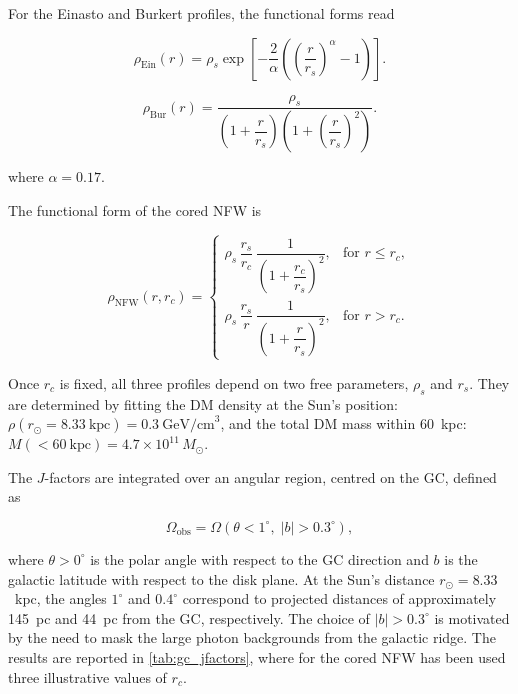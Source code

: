 For the Einasto and Burkert profiles, the functional forms read

\begin{equation}
\label{eq:rho_einasto}
\rho_{\mathrm{Ein}}(r)
=
\rho_s \exp\!\left[
-\frac{2}{\alpha}\left(\left(\frac{r}{r_s}\right)^{\alpha}-1\right)
\right].
\end{equation}

\begin{equation}
\label{eq:rho_burkert}
\rho_{\mathrm{Bur}}(r)
=
\frac{\rho_s}{\left(1+\dfrac{r}{r_s}\right)\left(1+\left(\dfrac{r}{r_s}\right)^2\right)}.
\end{equation}

where $\alpha = 0.17$.

The functional form of the cored NFW is


\begin{equation}
\label{eq:rho_nfw_cored}
\rho_{\mathrm{NFW}}(r,r_c)=
\begin{cases}
\rho_s\,\dfrac{r_s}{r_c}\,\dfrac{1}{\left(1+\dfrac{r_c}{r_s}\right)^2},
& \text{for } r \le r_c, \\[10pt]
\rho_s\,\dfrac{r_s}{r}\,\dfrac{1}{\left(1+\dfrac{r}{r_s}\right)^2},
& \text{for } r > r_c.
\end{cases}
\end{equation}

Once $r_c$ is fixed, all three profiles depend on two free parameters, $\rho_s$ and $r_s$.
They are determined by fitting the DM density at the Sun's position: $\rho(r_\odot = 8.33~\text{kpc}) = 0.3~\text{GeV/cm}^3$, and the total DM mass within 60~kpc: $M(<60~\text{kpc}) = 4.7 \times 10^{11}\,M_\odot$.

The $J$-factors are integrated over an angular region, centred on the GC, defined as 

\begin{equation}
\label{eq:Omega_obs}
    \Omega_\mathrm{obs} = \Omega(\theta < 1^\circ,\; |b| > 0.3^\circ),
\end{equation}

where $\theta > 0^\circ$ is the polar angle with respect to the GC direction 
and $b$ is the galactic latitude with respect to the disk plane. At the Sun's 
distance $r_\odot = 8.33$~kpc, the angles $1^\circ$ and $0.4^\circ$ correspond 
to projected distances of approximately 145~pc and 44~pc from the GC, respectively. 
The choice of $|b| > 0.3^\circ$ is motivated by the need to mask the large photon backgrounds from the galactic ridge.
The results are reported in \cref{tab:gc_jfactors}, where for the cored NFW has been used three illustrative values of $r_c$.


